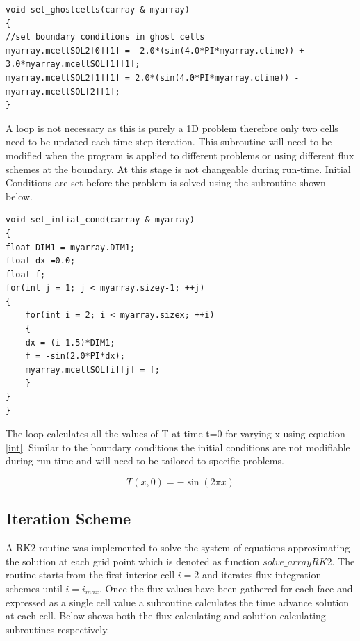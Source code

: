 \documentclass[paper=a4, fontsize=11pt, abstract=on]{scrartcl}
\numberwithin{equation}{section}		%
\numberwithin{figure}{section}			%
\numberwithin{table}{section}				%
\begin{document}
\begin{lstlisting}
void set_ghostcells(carray & myarray)
{
//set boundary conditions in ghost cells
myarray.mcellSOL2[0][1] = -2.0*(sin(4.0*PI*myarray.ctime)) + 3.0*myarray.mcellSOL[1][1];
myarray.mcellSOL2[1][1] = 2.0*(sin(4.0*PI*myarray.ctime)) - myarray.mcellSOL[2][1];	
}
\end{lstlisting}
A loop is not necessary as this is purely a 1D problem therefore only two cells need to be updated each time step iteration. This subroutine will need to be modified when the program is applied to different problems or using different flux schemes at the boundary. At this stage is not changeable during run-time. Initial Conditions are set before the problem is solved using the subroutine shown below.
\begin{lstlisting}
void set_intial_cond(carray & myarray)
{
float DIM1 = myarray.DIM1;
float dx =0.0;
float f;
for(int j = 1; j < myarray.sizey-1; ++j)
{
    for(int i = 2; i < myarray.sizex; ++i)
    {
    dx = (i-1.5)*DIM1;
    f = -sin(2.0*PI*dx);
    myarray.mcellSOL[i][j] = f;
    }
}
}
\end{lstlisting}
The loop calculates all the values of T at time t=0 for varying x using equation \ref{int}. Similar to the boundary conditions the initial conditions are not modifiable during run-time and will need to be tailored to specific problems.

 \begin{equation}
\label{int}
T(x,0) = -\sin{(2\pi x)}
\end{equation}
  
\subsection{Iteration Scheme}
A RK2 routine was implemented to solve the system of equations approximating the solution at each grid point which is denoted as function $solve\_ arrayRK2$. The routine starts from the first interior cell $i = 2$ and iterates flux integration schemes until $i = i_{max}$. Once the flux values have been gathered for each face and expressed as a single cell value a subroutine calculates the time advance solution at each cell. Below shows both the flux calculating and solution calculating subroutines respectively.
\end{document}

